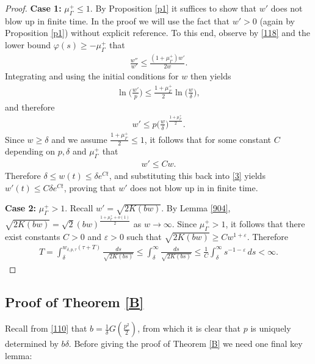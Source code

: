 \documentclass[12pt]{article}
\numberwithin{equation}{section}
\theoremstyle{plain}
\theoremstyle{definition}
\newcommand{\ep}{\varepsilon}
\renewcommand{\phi}{\varphi}
\begin{document}
\begin{proof}
	\noindent\textbf{Case 1:} $\mu_\Gamma^+ \leq 1$. By Proposition \ref{p1} it suffices to show that $w'$ does not blow up in finite time. In the proof we will use the fact that $w'>0$ (again by Proposition \ref{p1}) without explicit reference. To this end, observe by \eqref{118} and the lower bound $\phi(s) \geq -\mu_\Gamma^+$ that
	\begin{align*}
	\frac{w''}{w'} \leq \frac{(1+\mu_\Gamma^+)w'}{2w}.
	\end{align*}
Integrating and using the initial conditions for $w$ then yields
	\begin{align*}
	\ln\bigg(\frac{w'}{p}\bigg) \leq \frac{1+\mu_\Gamma^+}{2}\ln\bigg(\frac{w}{\delta}\bigg),
	\end{align*}
	and therefore
	\begin{align*}
	w' \leq p\bigg(\frac{w}{\delta}\bigg)^{\frac{1+\mu_\Gamma^+}{2}}. 
	\end{align*}
	Since $w \geq \delta$ and we assume $\frac{1+\mu_\Gamma^+}{2} \leq 1$, it follows that for some constant $C$ depending on $p,\delta$ and $\mu_\Gamma^+$ that
	\begin{align}\label{3}
	w' \leq Cw. 
	\end{align}
	Therefore $\delta \leq w(t) \leq \delta e^{Ct}$, and substituting this back into \eqref{3} yields $w'(t) \leq C\delta e^{Ct}$, proving that $w'$ does not blow up in in finite time. \medskip 
	
	\noindent\textbf{Case 2:} $\mu_\Gamma^+ > 1$. Recall $w' = \sqrt{2K(bw)}$. By Lemma \ref{904}, $\sqrt{2K(bw)} =  \sqrt{2}(bw)^{\frac{1+\mu_\Gamma^+ + o(1)}{2}}$ as $w\rightarrow\infty$. Since $\mu_\Gamma^+>1$, it follows that there exist constants $C>0$ and $\ep>0$ such that $\sqrt{2K(bw)} \geq Cw^{1+\ep}$. Therefore
	\begin{align*}
	T = \int_\delta^{w_{\delta,p,\tau}(\tau+T)}  \frac{ds}{\sqrt{2K(bs)}} \leq \int_\delta^\infty \frac{ds}{\sqrt{2K(bs)}} \leq \frac{1}{C}\int_{\delta}^\infty s^{-1-\ep}\,ds<\infty. 
	\end{align*}

\end{proof}



\subsection{Proof of Theorem \ref{B}}

Recall from \eqref{110} that $b  = \frac{1}{\delta} G(\frac{p^2}{2})$, from which it is clear that $p$ is uniquely determined by $b\delta$. Before giving the proof of Theorem \ref{B} we need one final key lemma:
\end{document}
